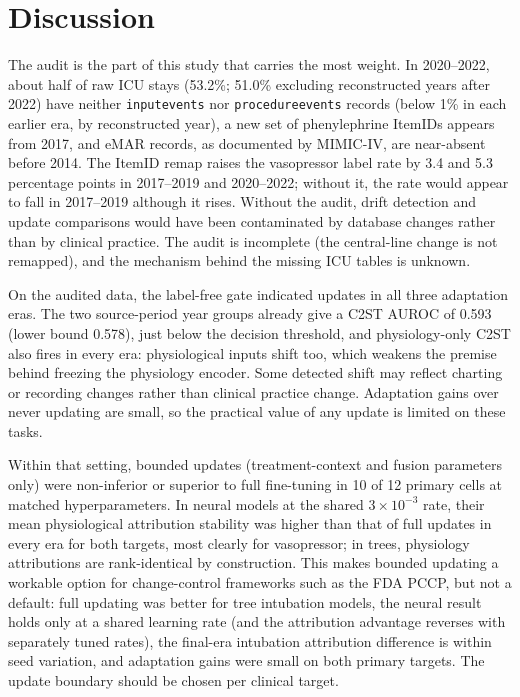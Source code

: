 \documentclass[10pt,a4paper,twocolumn]{article}
\begin{document}
	\section{Discussion}
	The audit is the part of this study that carries the most weight. In 2020--2022, about half of raw ICU stays (53.2\%; 51.0\% excluding reconstructed years after 2022) have neither \texttt{inputevents} nor \texttt{procedureevents} records (below 1\% in each earlier era, by reconstructed year), a new set of phenylephrine ItemIDs appears from 2017, and eMAR records, as documented by MIMIC-IV, are near-absent before 2014. The ItemID remap raises the vasopressor label rate by 3.4 and 5.3 percentage points in 2017--2019 and 2020--2022; without it, the rate would appear to fall in 2017--2019 although it rises. Without the audit, drift detection and update comparisons would have been contaminated by database changes rather than by clinical practice. The audit is incomplete (the central-line change is not remapped), and the mechanism behind the missing ICU tables is unknown.
	
	On the audited data, the label-free gate indicated updates in all three adaptation eras. The two source-period year groups already give a C2ST AUROC of 0.593 (lower bound 0.578), just below the decision threshold, and physiology-only C2ST also fires in every era: physiological inputs shift too, which weakens the premise behind freezing the physiology encoder. Some detected shift may reflect charting or recording changes rather than clinical practice change. Adaptation gains over never updating are small, so the practical value of any update is limited on these tasks.
	
	Within that setting, bounded updates (treatment-context and fusion parameters only) were non-inferior or superior to full fine-tuning in 10 of 12 primary cells at matched hyperparameters. In neural models at the shared $3\times10^{-3}$ rate, their mean physiological attribution stability was higher than that of full updates in every era for both targets, most clearly for vasopressor; in trees, physiology attributions are rank-identical by construction. This makes bounded updating a workable option for change-control frameworks such as the FDA PCCP, but not a default: full updating was better for tree intubation models, the neural result holds only at a shared learning rate (and the attribution advantage reverses with separately tuned rates), the final-era intubation attribution difference is within seed variation, and adaptation gains were small on both primary targets. The update boundary should be chosen per clinical target.
	
\end{document}
